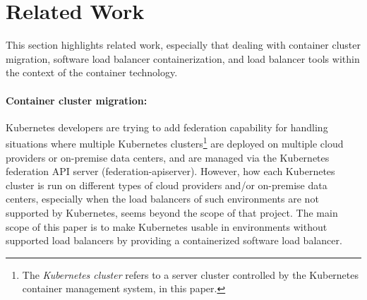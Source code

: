 \section{Related Work}\label{Related Work}

This section highlights related work, especially that dealing with container cluster migration, 
software load balancer containerization, and load balancer tools within the context of the container technology.

\paragraph{\bf Container cluster migration:}

Kubernetes developers are trying to add federation\cite{K8sFederation2017} capability for handling situations 
where multiple Kubernetes clusters\footnote{The {\em Kubernetes cluster} refers to a server cluster 
controlled by the Kubernetes container management system, in this paper.} 
are deployed on multiple cloud providers or on-premise data centers, 
and are managed via the Kubernetes federation API server (federation-apiserver). 
However, how each Kubernetes cluster is run on different types of cloud providers
and/or on-premise data centers, especially when the load balancers of such environments are not supported by Kubernetes, 
seems beyond the scope of that project. 
The main scope of this paper is to make Kubernetes usable in environments 
without supported load balancers by providing a containerized software load balancer.

